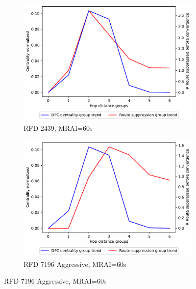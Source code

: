 \begin{figure}[H]
\begin{subfigure}[b]{0.325\textwidth}
     \end{subfigure}
     \vfill
     \begin{subfigure}[b]{0.325\textwidth}
         \centering
         \includegraphics[width=\textwidth]{images/RFD/miceVSelephants/MultiMRAI/60/mice/cisco_1000_RFD_nodeConvergence_centVSsup_trend.pdf}
         \caption{\scriptsize RFD 2439, MRAI=60s}
         \label{fig:1000_2439RFD_centVSsup_mices_MRAI60}
     \end{subfigure}
     \hfill
     \begin{subfigure}[b]{0.325\textwidth}
         \centering
         \includegraphics[width=\textwidth]{images/RFD/miceVSelephants/MultiMRAI/60/mice/cisco_1000_RFD_7196_aggressive_nodeConvergence_centVSsup_trend.pdf}
         \caption{\scriptsize RFD 7196 Aggressive, MRAI=60s}
         \label{fig:1000_7196RFDA_centVSsup_mices_MRAI60}

\end{subfigure}
\end{figure}
